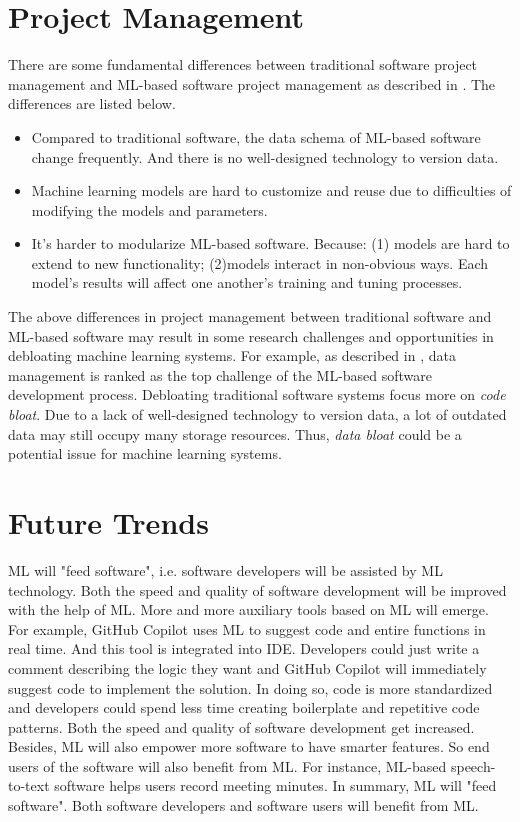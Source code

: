 \documentclass[11pt, a4paper]{article}
\begin{document}
\section{Project Management}
There are some fundamental differences between traditional software project management and ML-based software project management as described in \cite{AmershiMLEng}.
The differences are listed below.
\begin{itemize}
    \item Compared to traditional software, the data schema of ML-based software change frequently. 
    And there is no well-designed technology to version data.
    \item Machine learning models are hard to customize and reuse due to difficulties of modifying the models and parameters.
    \item It’s harder to modularize ML-based software. Because: (1) models are hard to extend to new functionality; (2)models interact in non-obvious ways. Each model’s results will affect one another’s training and tuning processes.
\end{itemize}
The above differences in project management between traditional software and ML-based software may result in some research challenges and opportunities in debloating machine learning systems.
For example, as described in \cite{AmershiMLEng}, data management is ranked as the top challenge of the ML-based software development process.
Debloating traditional software systems focus more on \textit{code bloat}. 
Due to a lack of well-designed technology to version data, 
a lot of outdated data may still occupy many storage resources.
Thus, \textit{data bloat} could be a potential issue for machine learning systems.
\section{Future Trends}
ML will "feed software", i.e. software developers will be assisted by ML technology.
Both the speed and quality of software development will be improved with the help of ML.
More and more auxiliary tools based on ML will emerge.
For example, GitHub Copilot uses ML to suggest code and entire functions in real time.
And this tool is integrated into IDE.
Developers could just write a comment describing the logic they want and 
GitHub Copilot will immediately suggest code to implement the solution.
In doing so, code is more standardized and developers could spend less time creating boilerplate and repetitive code patterns.
Both the speed and quality of software development get increased. 
Besides, ML will also empower more software to have smarter features.
So end users of the software will also benefit from ML. 
For instance, ML-based speech-to-text software helps users record meeting minutes.
In summary, ML will "feed software". 
Both software developers and software users will benefit from ML.
\end{document}
